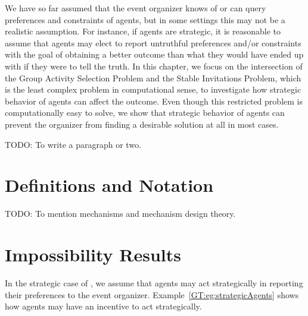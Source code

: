 \label{GT:chapter}


We have so far assumed that the event organizer knows of or can query preferences and constraints of agents, but in some settings this may not be a realistic assumption. For instance, if agents are strategic, it is reasonable to assume that agents may elect to report untruthful preferences and/or constraints with the goal of obtaining a better outcome than what they would have ended up with if they were to tell the truth. 
In this chapter, we focus on the intersection of the Group Activity Selection Problem and the Stable Invitations Problem, which is the least complex problem in computational sense, to investigate how strategic behavior of agents can affect the outcome. Even though this restricted problem is computationally easy to solve, we show that strategic behavior of agents can prevent the organizer from finding a desirable solution at all in most cases.


TODO: To write a paragraph or two.


\section{Definitions and Notation} \label{GT:sec:prelim}

TODO: To mention mechanisms and mechanism design theory.



\section{Impossibility Results}\label{GT:sec:Mechanism}
In the strategic case of \ASIP, we assume that agents may act strategically in reporting their preferences to the event organizer. 
Example~\ref{GT:eg:strategicAgents} shows how agents may have an incentive to act strategically. 


